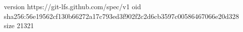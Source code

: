 version https://git-lfs.github.com/spec/v1
oid sha256:56e19562cf130b66272a17c793ed3f902f2c2d6cb3597c00586467066e20d328
size 21321
